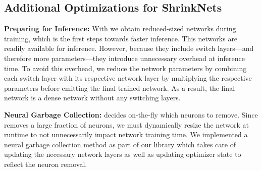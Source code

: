 
\subsection{Additional Optimizations for ShrinkNets}

\noindent\textbf{Preparing for Inference: } With \shrink we obtain
reduced-sized networks during training, which is the first steps towards faster
inference. This networks are readily available for inference. However, because
they include switch layers---and therefore more parameters---they introduce
unnecessary overhead at inference time. To avoid this overhead, we reduce the
network parameters by combining each switch layer with its respective network
layer by multiplying the respective parameters before emitting the final trained
network. As a result, the final network is a dense network without any switching layers. 

\noindent\textbf{Neural Garbage Collection: } \shrink decides on-the-fly which
neurons to remove. Since \shrink removes a large fraction of neurons, we must
dynamically resize the network at runtime to not unnecessarily impact network
training time. We implemented a neural garbage collection method as part of our
library which takes care of updating the necessary network layers as well as
updating optimizer state to reflect the neuron removal.


